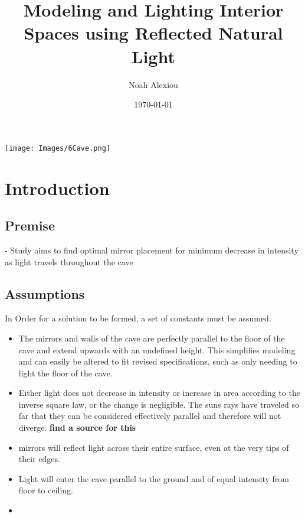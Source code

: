 \documentclass[11pt, letterpaper]{article}
\begin{document}
\begin{titlepage}
	\title{Modeling and Lighting Interior Spaces using Reflected Natural Light}
	\author{Noah Alexiou}
	\date{\today}
	
	\maketitle
	\centering
	\texttt{[image: Images/6Cave.png]}
	
\end{titlepage}

\newpage
\tableofcontents


\newpage

\section{Introduction}


\subsection{Premise}
- Study aims to find optimal mirror placement for minimum decrease in intensity as light travels throughout the cave




\subsection{Assumptions} 
\par
In Order for a solution to be formed, a set of constants must be assumed.
\begin{itemize}
	\item The mirrors and walls of the cave are perfectly parallel to the floor of the cave and extend upwards with an undefined height. This simplifies modeling and can easily be altered to fit revised specifications, such as only needing to light the floor of the cave.
	
	\item Either light does not decrease in intensity or increase in area according to the inverse square law, or the change is negligible. The suns rays have traveled so far that they can be considered effectively parallel and therefore will not diverge. 
	\textbf{find a source for this}
		
	\item mirrors will reflect light across their entire surface, even at the very tips of their edges. 
		
	\item Light will enter the cave parallel to the ground and of equal intensity from floor to ceiling.
	
	\item 
\end{itemize}
\end{document}
